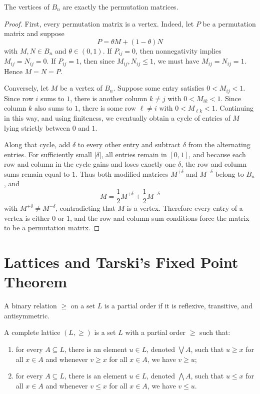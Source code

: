 \begin{theorem}
	The vertices of $B_n$ are exactly the permutation matrices.
\end{theorem}
\begin{proof}
	First, every permutation matrix is a vertex. Indeed, let $P$ be a permutation matrix and suppose
	\[
		P = \theta M + (1-\theta)N
	\]
	with $M,N \in B_n$ and $\theta \in (0,1)$. If $P_{ij} = 0$, then nonnegativity implies $M_{ij} = N_{ij} = 0$. If $P_{ij} = 1$, then since $M_{ij},N_{ij} \le 1$, we must have $M_{ij} = N_{ij} = 1$. Hence $M=N=P$.

	Conversely, let $M$ be a vertex of $B_n$. Suppose some entry satisfies $0 < M_{ij} < 1$. Since row $i$ sums to $1$, there is another column $k \ne j$ with $0 < M_{ik} < 1$. Since column $k$ also sums to $1$, there is some row $\ell \ne i$ with $0 < M_{\ell k} < 1$. Continuing in this way, and using finiteness, we eventually obtain a cycle of entries of $M$ lying strictly between $0$ and $1$.

	Along that cycle, add $\delta$ to every other entry and subtract $\delta$ from the alternating entries. For sufficiently small $\left|\delta\right|$, all entries remain in $\left[0,1\right]$, and because each row and column in the cycle gains and loses exactly one $\delta$, the row and column sums remain equal to $1$. Thus both modified matrices $M^{+\delta}$ and $M^{-\delta}$ belong to $B_n$, and
	\[
		M = \frac{1}{2}M^{+\delta} + \frac{1}{2}M^{-\delta}
	\]
	with $M^{+\delta} \ne M^{-\delta}$, contradicting that $M$ is a vertex. Therefore every entry of a vertex is either $0$ or $1$, and the row and column sum conditions force the matrix to be a permutation matrix.
\end{proof}

\section{Lattices and Tarski's Fixed Point Theorem}

\begin{definition}
	A binary relation $\ge$ on a set $L$ is a partial order if it is reflexive, transitive, and antisymmetric.
\end{definition}

\begin{definition}
	A complete lattice $(L,\ge)$ is a set $L$ with a partial order $\ge$ such that:
	\begin{enumerate}[label = (\roman*)]
		\item for every $A \subseteq L$, there is an element $u \in L$, denoted $\bigvee A$, such that $u \ge x$ for all $x \in A$ and whenever $v \ge x$ for all $x \in A$, we have $v \ge u$;
		\item for every $A \subseteq L$, there is an element $u \in L$, denoted $\bigwedge A$, such that $u \le x$ for all $x \in A$ and whenever $v \le x$ for all $x \in A$, we have $v \le u$.
	\end{enumerate}
\end{definition}

